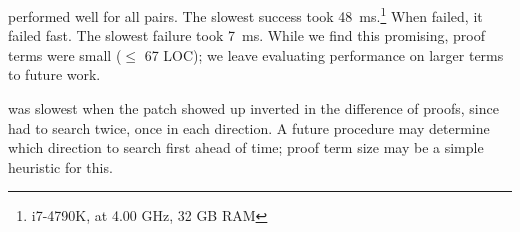 \sysname performed well for all pairs. The slowest success took \SI{48}{\ms}.\footnote{i7-4790K, at 4.00 GHz, 32 GB RAM}
When \sysname failed, it failed fast. The slowest failure took \SI{7}{\ms}.
While we find this promising, proof terms were small ($\le$ 67 LOC);
we leave evaluating performance on larger terms
to future work.



\sysname was slowest %
when the patch showed up inverted in the difference of proofs,
since \sysname had to search twice, once in each direction.
A future procedure may %
determine which direction to search first ahead of time; proof term size may be a simple heuristic for this.

